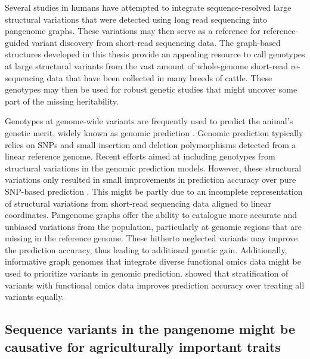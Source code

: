 \documentclass[../main.tex]{subfiles}
\begin{document}
Several studies in humans \citep{eggertsson2019graphtyper2,chen2019paragraph,hickey2020genotyping} have attempted to integrate sequence-resolved large structural variations that were detected using long read sequencing into pangenome graphs. These variations may then serve as a reference for reference-guided variant discovery from short-read sequencing data. The graph-based structures developed in this thesis provide an appealing resource to call genotypes at large structural variants from the vast amount of whole-genome short-read re-sequencing data that have been collected in many breeds of cattle. These genotypes may then  be used for robust genetic studies that might uncover some part of the missing heritability.

Genotypes at genome-wide variants are frequently used to predict the animal’s genetic merit, widely known as genomic prediction \citep{meuwissen2001prediction}. Genomic prediction typically relies on SNPs and small insertion and deletion polymorphisms detected from a linear reference genome. Recent efforts aimed at including genotypes from structural variations in the genomic prediction models. However, these structural variations only resulted in small improvements in prediction accuracy over pure SNP-based prediction \citep{el2018genomic,chen2021investigating}. This might be partly due to an incomplete representation of structural variations from short-read sequencing data aligned to linear coordinates. Pangenome graphs offer the ability to catalogue more accurate and unbiased variations from the population, particularly at genomic regions that are missing in the reference genome. These hitherto neglected variants may improve the prediction accuracy, thus leading to additional genetic gain. Additionally, informative graph genomes that integrate diverse functional omics data might be used to prioritize variants in genomic prediction. \citet{macleod2016exploiting} showed that stratification of variants with functional omics data improves prediction accuracy over treating all variants equally. 


\subsection*{Sequence variants in the pangenome might be causative for agriculturally important traits}
\end{document}
